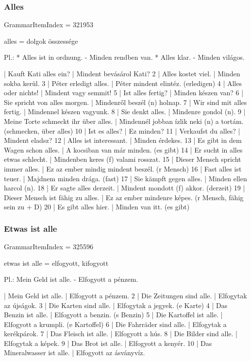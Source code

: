 \documentclass{article}
\newenvironment{desc}{\verbatim}{\endverbatim}
\newenvironment{exmp}{\verbatim}{\endverbatim}
\begin{document}
\subsubsection{Alles}

GrammarItemIndex = 321953

\begin{desc}
alles = dolgok összessége

Pl.: * Alles ist in ordnung. - Minden rendben van.
* Alles klar. - Minden világos.
\end{desc}

\begin{exmp}
1 | Kauft Kati alles ein? | Mindent bevásárol Kati?
2 | Alles kostet viel. | Minden sokba kerül.
3 | Péter erledigt alles. | Péter mindent elintéz. (erledigen)
4 | Alles oder nichts! | Mindent vagy semmit!
5 | Ist alles fertig? | Minden készen van?
6 | Sie spricht von alles morgen. | Mindenről beszél (n) holnap.
7 | Wir sind mit alles fertig. | Mindennel készen vagyunk.
8 | Sie denkt alles. | Mindenre gondol (n).
9 | Meine Torte schmeckt ihr über alles. | Mindennél jobban ízlik neki (n) a tortám. (schmecken, über alles)
10 | Ist es alles? | Ez minden?
11 | Verkaufst du alles? | Mindent eladsz?
12 | Alles ist interessant. | Minden érdekes.
13 | Es gibt in dem Wagen schon alles. | A kocsiban van már minden. (es gibt)
14 | Er sucht in alles etwas schlecht. | Mindenben keres (f) valami rosszat.
15 | Dieser Mensch spricht immer alles. | Ez az ember mindig mindent beszél. (r Mensch)
16 | Fast alles ist teuer. | Majdnem minden drága. (fast)
17 | Sie kämpft gegen alles. | Minden ellen harcol (n).
18 | Er sagte alles derzeit. | Mindent mondott (f) akkor. (derzeit)
19 | Dieser Mensch ist fähig zu alles. | Ez az ember mindenre képes. (r Mensch, fähig sein zu + D)
20 | Es gibt alles hier. | Minden van itt. (es gibt)
\end{exmp}

\subsubsection{Etwas ist alle}

GrammarItemIndex = 325596

\begin{desc}
etwas ist alle = elfogyott, kifogyott

Pl.: Mein Geld ist alle. - Elfogyott a pénzem.
\end{desc}

\begin{exmp}
1 | Mein Geld ist alle. | Elfogyott a pénzem.
2 | Die Zeitungen sind alle. | Elfogytak az újságok.
3 | Die Karten sind alle. | Elfogytak a jegyek. (e Karte)
4 | Das Benzin ist alle. | Elfogyott a benzin. (s Benzin)
5 | Die Kartoffel ist alle. | Elfogyott a krumpli. (e Kartoffel)
6 | Die Fahrräder sind alle. | Elfogytak a kerékpárok.
7 | Das Fleisch ist alle. | Elfogyott a hús.
8 | Die Bilder sind alle. | Elfogytak a képek.
9 | Das Brot ist alle. | Elfogyott a kenyér.
10 | Das Mineralwasser ist alle. | Elfogyott az ásványvíz.
\end{exmp}
\end{document}
